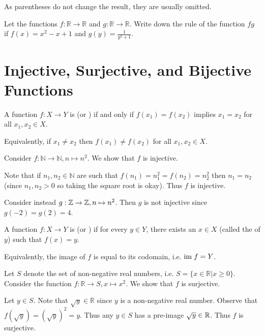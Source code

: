 As parentheses do not change the result, they are usually omitted.

\begin{exercise}
    Let the functions $f: \mathbb{R} \to \mathbb{R}$ and $g: \mathbb{R} \to \mathbb{R}$. Write down the rule of the function $fg$ if $f(x) = x^2 - x + 1$ and $g(y) = \frac1{y^2+1}$.
\end{exercise}

\section{Injective, Surjective, and Bijective Functions}
\begin{definition}
    A function $f: X \to Y$ is  (or ) if and only if $f(x_1) = f(x_2)$ implies $x_1 = x_2$ for all $x_1, x_2 \in X$.
\end{definition}
\begin{remark}
    Equivalently, if $x_1 \neq x_2$ then $f(x_1) \neq f(x_2)$ for all $x_1, x_2 \in X$.
\end{remark}

\begin{example}
    Consider $f: \mathbb{N} \to \mathbb{N}, n \mapsto n^2$. We show that $f$ is injective.

    Note that if $n_1, n_2 \in \mathbb{N}$ are such that $f(n_1) = n_1^2 = f(n_2) = n_2^2$ then $n_1 = n_2$ (since $n_1, n_2 > 0$ so taking the square root is okay). Thus $f$ is injective.
\end{example}
\begin{example}
    Consider instead $g: \mathbb{Z} \to \mathbb{Z}, n \mapsto n^2$. Then $g$ is not injective since $g(-2) = g(2) = 4$.
\end{example}

\begin{definition}
    A function $f: X \to Y$ is  (or ) if for every $y \in Y$, there exists an $x \in X$ (called the  of $y$) such that $f(x) = y$.
\end{definition}
\begin{remark}
    Equivalently, the image of $f$ is equal to its codomain, i.e. $\mathrm{im}\; f = Y$.
\end{remark}

\begin{example}
    Let $S$ denote the set of non-negative real numbers, i.e. $S = \{x\in\mathbb{R} | x \geq 0\}$. Consider the function $f: \mathbb{R} \to S, x \mapsto x^2$. We show that $f$ is surjective.

    Let $y \in S$. Note that $\sqrt{y} \in \mathbb{R}$ since $y$ is a non-negative real number. Observe that $f(\sqrt{y}) = (\sqrt y)^2 = y$. Thus any $y \in S$ has a pre-image $\sqrt y \in \mathbb{R}$. Thus $f$ is surjective.
\end{example}

